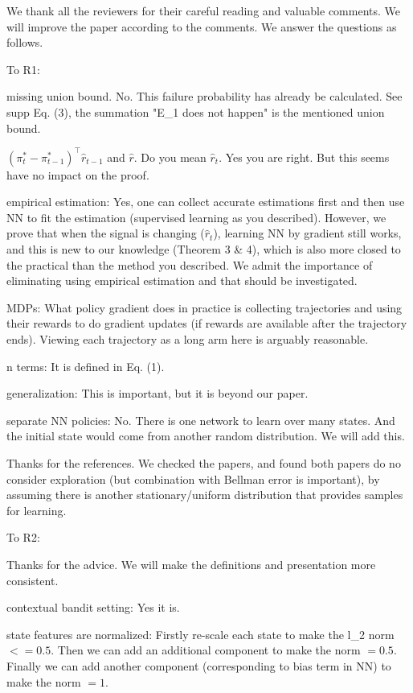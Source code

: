 \documentclass{article}
\begin{document}
We thank all the reviewers for their careful reading and valuable comments. We will improve the paper according to the comments. We answer the questions as follows.

To R1: 

missing union bound. No. This failure probability has already be calculated. See supp Eq. (3), the summation "E\_1 does not happen" is the mentioned union bound.

$(\pi_t^* - \pi_{t-1}^*)^\top \hat{r}_{t-1}$ and $\hat{r}$. Do you mean $\hat{r}_t$. Yes you are right. But this seems have no impact on the proof.

empirical estimation: Yes, one can collect accurate estimations first and then use NN to fit the estimation (supervised learning as you described). However, we prove that when the signal is changing ($\hat{r}_t$), learning NN by gradient still works, and this is new to our knowledge (Theorem 3 \& 4), which is also more closed to the practical than the method you described. We admit the importance of eliminating using empirical estimation and that should be investigated.

MDPs: What policy gradient does in practice is collecting trajectories and using their rewards to do gradient updates (if rewards are available after the trajectory ends). Viewing each trajectory as a long arm here is arguably reasonable. 

n terms: It is defined in Eq. (1).

generalization: This is important, but it is beyond our paper.

separate NN policies: No. There is one network to learn over many states. And the initial state would come from another random distribution. We will add this.

Thanks for the references. We checked the papers, and found both papers do no consider exploration (but combination with Bellman error is important), by assuming there is another stationary/uniform distribution that provides samples for learning.

To R2:

Thanks for the advice. We will make the definitions and presentation more consistent.

contextual bandit setting: Yes it is.

state features are normalized: Firstly re-scale each state to make the l\_2 norm $<= 0.5$. Then we can add an additional component to make the norm $= 0.5$. Finally we can add another component (corresponding to bias term in NN) to make the norm $= 1$.
\end{document}
